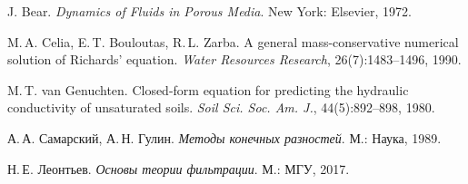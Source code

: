 \documentclass[a4paper,12pt]{article}
\begin{document}
\begin{thebibliography}{9}
J. Bear. \emph{Dynamics of Fluids in Porous Media}. New York: Elsevier, 1972.

M.\,A. Celia, E.\,T. Bouloutas, R.\,L. Zarba. A general mass-conservative numerical solution of Richards' equation. \emph{Water Resources Research}, 26(7):1483–1496, 1990.

M.\,T. van Genuchten. Closed-form equation for predicting the hydraulic conductivity of unsaturated soils. \emph{Soil Sci. Soc. Am. J.}, 44(5):892–898, 1980.

А.\,А. Самарский, А.\,Н. Гулин. \emph{Методы конечных разностей}. М.: Наука, 1989.

Н.\,Е. Леонтьев. \emph{Основы теории фильтрации}. М.: МГУ, 2017.
\end{thebibliography}

\end{document}
